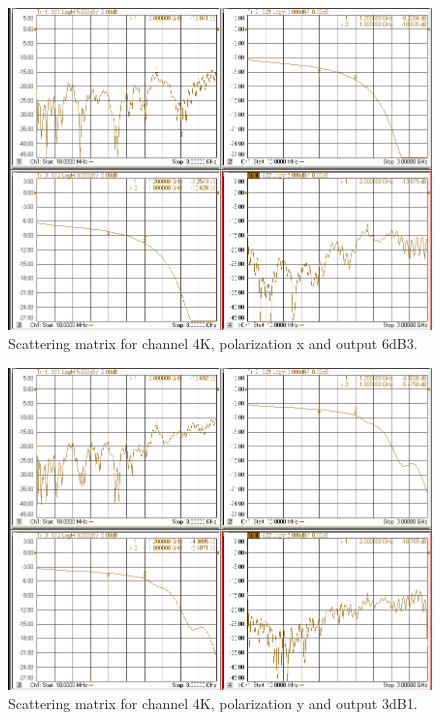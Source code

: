 \documentclass[12pt,a4paper,oneside]{article}
\begin{document}
\begin{figure}[H]
\centering
\includegraphics[width=0.9\linewidth]{VNA_results/4Kx_6dB3.png}
\caption{Scattering matrix for channel 4K, polarization x and output 6dB3.}
\label{fig:4Kx_6dB3}
\end{figure}


\begin{figure}[H]
\centering
\includegraphics[width=0.9\linewidth]{VNA_results/4Ky_3dB1.png}
\caption{Scattering matrix for channel 4K, polarization y and output 3dB1.}
\label{fig:4Ky_3dB1}
\end{figure}
\end{document}
